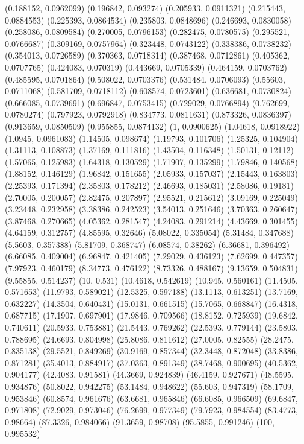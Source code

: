 {(0.188152, 0.0962099)
(0.196842, 0.093274)
(0.205933, 0.0911321)
(0.215443, 0.0884553)
(0.225393, 0.0864534)
(0.235803, 0.0848696)
(0.246693, 0.0830058)
(0.258086, 0.0809584)
(0.270005, 0.0796153)
(0.282475, 0.0780575)
(0.295521, 0.0766687)
(0.309169, 0.0757964)
(0.323448, 0.0743122)
(0.338386, 0.0738232)
(0.354013, 0.0726589)
(0.370363, 0.0718314)
(0.387468, 0.0712861)
(0.405362, 0.0707765)
(0.424083, 0.070319)
(0.443669, 0.0705339)
(0.464159, 0.0703762)
(0.485595, 0.0701864)
(0.508022, 0.0703376)
(0.531484, 0.0706093)
(0.55603, 0.0711068)
(0.581709, 0.0718112)
(0.608574, 0.0723601)
(0.636681, 0.0730824)
(0.666085, 0.0739691)
(0.696847, 0.0753415)
(0.729029, 0.0766894)
(0.762699, 0.0780274)
(0.797923, 0.0792918)
(0.834773, 0.0811631)
(0.873326, 0.0836397)
(0.913659, 0.0850509)
(0.955855, 0.0874132)
(1, 0.0900625)
(1.04618, 0.0918922)
(1.0945, 0.0961083)
(1.14505, 0.098674)
(1.19793, 0.101706)
(1.25325, 0.104904)
(1.31113, 0.108873)
(1.37169, 0.111816)
(1.43504, 0.116348)
(1.50131, 0.12112)
(1.57065, 0.125983)
(1.64318, 0.130529)
(1.71907, 0.135299)
(1.79846, 0.140568)
(1.88152, 0.146129)
(1.96842, 0.151655)
(2.05933, 0.157037)
(2.15443, 0.163803)
(2.25393, 0.171394)
(2.35803, 0.178212)
(2.46693, 0.185031)
(2.58086, 0.19181)
(2.70005, 0.200057)
(2.82475, 0.207897)
(2.95521, 0.215612)
(3.09169, 0.225049)
(3.23448, 0.232958)
(3.38386, 0.242523)
(3.54013, 0.251646)
(3.70363, 0.260647)
(3.87468, 0.270665)
(4.05362, 0.281547)
(4.24083, 0.291214)
(4.43669, 0.301455)
(4.64159, 0.312757)
(4.85595, 0.32646)
(5.08022, 0.335054)
(5.31484, 0.347688)
(5.5603, 0.357388)
(5.81709, 0.368747)
(6.08574, 0.38262)
(6.36681, 0.396492)
(6.66085, 0.409004)
(6.96847, 0.421405)
(7.29029, 0.436123)
(7.62699, 0.447357)
(7.97923, 0.460179)
(8.34773, 0.476122)
(8.73326, 0.488167)
(9.13659, 0.504831)
(9.55855, 0.514237)
(10, 0.531)
(10.4618, 0.542619)
(10.945, 0.560161)
(11.4505, 0.571653)
(11.9793, 0.589021)
(12.5325, 0.597188)
(13.1113, 0.613251)
(13.7169, 0.632227)
(14.3504, 0.640431)
(15.0131, 0.661515)
(15.7065, 0.668847)
(16.4318, 0.687715)
(17.1907, 0.697901)
(17.9846, 0.709566)
(18.8152, 0.725939)
(19.6842, 0.740611)
(20.5933, 0.753881)
(21.5443, 0.769262)
(22.5393, 0.779144)
(23.5803, 0.788695)
(24.6693, 0.804998)
(25.8086, 0.811612)
(27.0005, 0.82555)
(28.2475, 0.835138)
(29.5521, 0.849269)
(30.9169, 0.857344)
(32.3448, 0.872048)
(33.8386, 0.871281)
(35.4013, 0.884917)
(37.0363, 0.891349)
(38.7468, 0.900695)
(40.5362, 0.904177)
(42.4083, 0.91581)
(44.3669, 0.924839)
(46.4159, 0.927671)
(48.5595, 0.934876)
(50.8022, 0.942275)
(53.1484, 0.948622)
(55.603, 0.947319)
(58.1709, 0.953846)
(60.8574, 0.961676)
(63.6681, 0.965846)
(66.6085, 0.966509)
(69.6847, 0.971808)
(72.9029, 0.973046)
(76.2699, 0.977349)
(79.7923, 0.984554)
(83.4773, 0.98664)
(87.3326, 0.984066)
(91.3659, 0.98708)
(95.5855, 0.991246)
(100, 0.995532)
}

